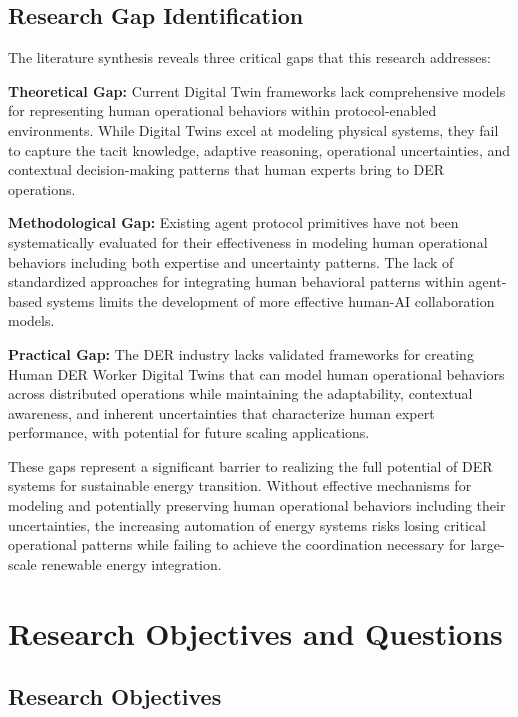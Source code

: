 \documentclass[12pt,a4paper]{article}
\begin{document}
\subsection{Research Gap Identification}

The literature synthesis reveals three critical gaps that this research addresses:

\textbf{Theoretical Gap:} Current Digital Twin frameworks lack comprehensive models for representing human operational behaviors within protocol-enabled environments. While Digital Twins excel at modeling physical systems, they fail to capture the tacit knowledge, adaptive reasoning, operational uncertainties, and contextual decision-making patterns that human experts bring to DER operations.

\textbf{Methodological Gap:} Existing agent protocol primitives have not been systematically evaluated for their effectiveness in modeling human operational behaviors including both expertise and uncertainty patterns. The lack of standardized approaches for integrating human behavioral patterns within agent-based systems limits the development of more effective human-AI collaboration models.

\textbf{Practical Gap:} The DER industry lacks validated frameworks for creating Human DER Worker Digital Twins that can model human operational behaviors across distributed operations while maintaining the adaptability, contextual awareness, and inherent uncertainties that characterize human expert performance, with potential for future scaling applications.

These gaps represent a significant barrier to realizing the full potential of DER systems for sustainable energy transition. Without effective mechanisms for modeling and potentially preserving human operational behaviors including their uncertainties, the increasing automation of energy systems risks losing critical operational patterns while failing to achieve the coordination necessary for large-scale renewable energy integration.

\section{Research Objectives and Questions}
\label{sec:objectives}

\subsection{Research Objectives}
\end{document}
